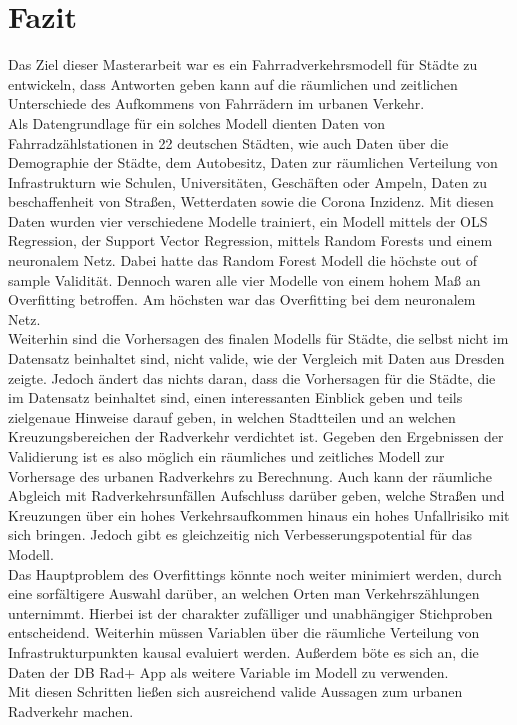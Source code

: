\documentclass[a4paper,12pt]{thesis}
\begin{document}
\section{Fazit}

Das Ziel dieser Masterarbeit war es ein Fahrradverkehrsmodell für Städte zu entwickeln, dass Antworten geben kann auf die räumlichen und zeitlichen Unterschiede des Aufkommens von Fahrrädern im urbanen Verkehr.\\
Als Datengrundlage für ein solches Modell dienten Daten von Fahrradzählstationen in 22 deutschen Städten, wie auch Daten über die Demographie der Städte, dem Autobesitz, Daten zur räumlichen Verteilung von Infrastrukturn wie Schulen, Universitäten, Geschäften oder Ampeln, Daten zu beschaffenheit von Straßen, Wetterdaten sowie die Corona Inzidenz. Mit diesen Daten wurden vier verschiedene Modelle trainiert, ein Modell mittels der OLS Regression, der Support Vector Regression, mittels Random Forests und einem neuronalem Netz. Dabei hatte das Random Forest Modell die höchste out of sample Validität. Dennoch waren alle vier Modelle von einem hohem Maß an Overfitting betroffen. Am höchsten war das Overfitting bei dem neuronalem Netz.\\
Weiterhin sind die Vorhersagen des finalen Modells für Städte, die selbst nicht im Datensatz beinhaltet sind, nicht valide, wie der Vergleich mit Daten aus Dresden zeigte. Jedoch ändert das nichts daran, dass die Vorhersagen für die Städte, die im Datensatz beinhaltet sind, einen interessanten Einblick geben und teils zielgenaue Hinweise darauf geben, in welchen Stadtteilen und an welchen Kreuzungsbereichen der Radverkehr verdichtet ist. Gegeben den Ergebnissen der Validierung ist es also möglich ein räumliches und zeitliches Modell zur Vorhersage des urbanen Radverkehrs zu Berechnung. Auch kann der räumliche Abgleich mit Radverkehrsunfällen Aufschluss darüber geben, welche Straßen und Kreuzungen über ein hohes Verkehrsaufkommen hinaus ein hohes Unfallrisiko mit sich bringen. Jedoch gibt es gleichzeitig nich Verbesserungspotential für das Modell.\\
Das Hauptproblem des Overfittings könnte noch weiter minimiert werden, durch eine sorfältigere Auswahl darüber, an welchen Orten man Verkehrszählungen unternimmt. Hierbei ist der charakter zufälliger und unabhängiger Stichproben entscheidend. Weiterhin müssen Variablen über die räumliche Verteilung von Infrastrukturpunkten kausal evaluiert werden. Außerdem böte es sich an, die Daten der DB Rad+ App als weitere Variable im Modell zu verwenden.\\
Mit diesen Schritten ließen sich ausreichend valide Aussagen zum urbanen Radverkehr machen.
\end{document}
